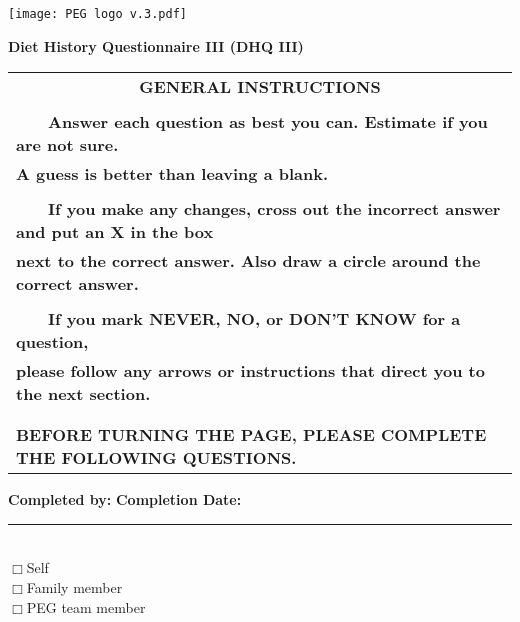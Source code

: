 \documentclass[letterpaper,fontsize=12pt,oneside,headsepline]{scrartcl}
\newcommand{\Qq}[1]{\textbf{#1}}
\newcommand{\QO}{$\Box$}%
\newcommand{\Qline}[1]{\noindent\rule{#1}{0.6pt}}
\newcommand{\tabitem}{~~\llap{\textbullet}~~}
\begin{document}
\texttt{[image: PEG logo v.3.pdf]}


\begin{center}
\Qq{\huge Diet History Questionnaire III (DHQ III)}
\end{center}

\begin{table}[h]
\centering
\begin{tabular}{l}
\toprule
\multicolumn{1}{c}{\Qq {GENERAL INSTRUCTIONS}}\\ 
\\ 
\tabitem \Qq {Answer each question as best you can.  Estimate if you are not sure.} \\ \Qq {A guess is better than leaving a blank. }\\ 
\\ 
\tabitem \Qq {If you make any changes, cross out the incorrect answer and put an X in the box} \\ \Qq {next to the correct answer.  Also draw a circle around the correct answer.}\\ 
\\ 
\tabitem \Qq {If you mark NEVER, NO, or DON’T KNOW for a question, }\\\Qq { please follow any arrows or instructions that direct you to the next section.} \\ 
\\ 
\\ 
\Qq {BEFORE TURNING THE PAGE, PLEASE COMPLETE THE FOLLOWING QUESTIONS.}\\
\bottomrule
\end{tabular}
\end{table}
 
\vspace*{\fill}
\indent \Qq{Completed by:}  \qquad \qquad \qquad \qquad \qquad\Qq{Completion Date:} \Qline{3cm}\\ 
\indent \QO \enspace Self \\ 
\indent \QO \enspace Family member \\ 
\indent \QO \enspace PEG team member



\newpage
\end{document}
